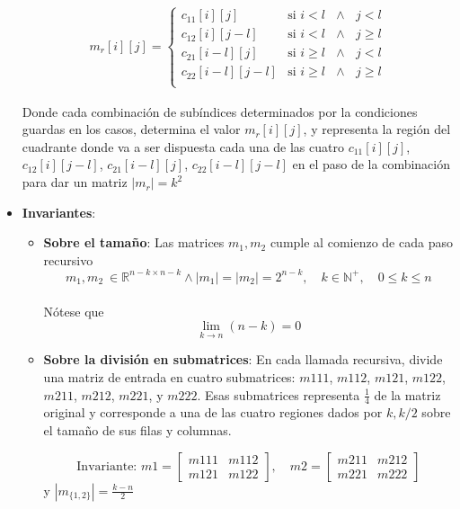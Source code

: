 \documentclass[12pt, a4paper]{article}
\begin{document}
\begin{itemize}
    
    \begin{align*}
    \text{{$m_r$}}[i][j] =
    \begin{cases}
        c_{11}[i][j] & \text{{si }} i < l \text{{ $\land$ }} j < l \\
        c_{12}[i][j-l] & \text{{si }} i < l \text{{ $\land$ }} j \geq l \\
        c_{21}[i-l][j] & \text{{si }} i \geq l \text{{ $\land$ }} j < l \\
        c_{22}[i-l][j-l] & \text{{si }} i \geq l \text{{ $\land$ }} j \geq l \\
    \end{cases}
    \end{align*}
    
    Donde cada combinación de subíndices determinados por la condiciones guardas en los casos, determina el valor
    $m_r[i][j]$, y representa la región del cuadrante donde va a ser dispuesta cada una de las cuatro  $c_{11}[i][j]$, $c_{12}[i][j-l]$, $c_{21}[i-l][j]$, $c_{22}[i-l][j-l]$ en el paso de la combinación para dar un matriz $|m_r|= k^2$

    \item \textbf{Invariantes}: 
    \begin{itemize}
        \item \textbf{Sobre el tamaño}: Las matrices $m_1, m_2$ cumple al comienzo de cada paso recursivo\\
        \[
          m_1, m_2~\in \mathbb{R}^{n-k \times n-k} \land |m_1|=|m_2|= 2^{n-k}, \quad k \in \mathbb{N}^+,\quad 0 \leq k \leq n 
        \] \\
        Nótese que \\ 
        \[ \lim_{k\to n} (n-k) = 0\]
        

        \item \textbf{Sobre la división en submatrices}: En cada llamada recursiva, divide una matriz de entrada en cuatro submatrices: $m{{1{11}}}$, $m{{1{12}}}$, $m{{1{21}}}$, $m{{1{22}}}$, $m{{2{11}}}$, $m{{2{12}}}$, $m{{2{21}}}$, y $m{{2{22}}}$. Esas submatrices representa $\frac{1}{4}$ de la matriz original
        y corresponde a una de las cuatro regiones dados por $k, k/2$ sobre el tamaño de sus filas y columnas.  
        
        \[
        \text{{Invariante: }} m1 = \begin{bmatrix} m{{1{11}}} & m{{1{12}}} \\ m{{1{21}}} & m{{1{22}}} \end{bmatrix}, \quad
        m2 = \begin{bmatrix} m{{2{11}}} & m{{2{12}}} \\ m{{2{21}}} & m{{2{22}}} \end{bmatrix}
        \]
        y $|m_{\{1,2\}}| = \frac{k-n}{2}$
        


\end{itemize}
\end{itemize}
\end{document}
